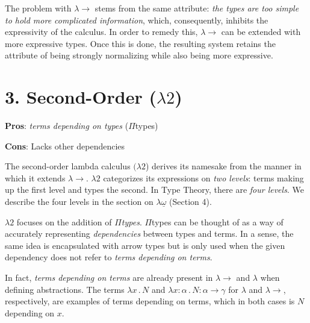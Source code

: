\documentclass[9pt,preprint,nocopyrightspace,computermodern]{sigplanconf} %
\begin{document}
The problem with \(\lambda\!\!\rightarrow\) stems from the same attribute:
\textit{the types are too simple to hold more complicated information},
which, consequently, inhibits the expressivity of the calculus. In order to
remedy this, \(\lambda\!\!\rightarrow\) can be extended with more expressive types.
Once this is done, the resulting system retains the attribute of being strongly
normalizing while also being more expressive.

\section*{3. Second-Order (\(\lambda2\))}
\begin{flushleft}
  \textbf{Pros}: \textit{terms depending on types} (\(\Pi\)types)
  \par
  \textbf{Cons}: Lacks other dependencies
\end{flushleft}
The second-order lambda calculus \((\lambda2\)) derives its namesake from the
manner in which it extends \(\lambda\!\!\rightarrow\). \(\lambda 2\) categorizes
its expressions on \textit{two levels}: terms making up the first level and types
the second. In Type Theory, there are \textit{four levels}. We describe the four
levels in the section on \(\lambda\underline\omega\) (Section 4).

\(\lambda 2\) focuses on the addition of \textit{\(\Pi\)types}. \(\Pi\)types can
be thought of as a way of accurately representing \textit{dependencies} between
types and terms. In a sense, the same idea is encapsulated with arrow types but is
only used when the given dependency does not refer to \textit{terms depending on terms}.

In fact, \textit{terms depending on terms} are already present in \(\lambda\!\!\rightarrow\)
and \(\lambda\) when defining abstractions. The terms \(\lambda x\,.\,N\) and
\(\lambda x:\alpha\,.\,N : \alpha\rightarrow\gamma\) for \(\lambda\) and
\(\lambda\!\!\rightarrow\), respectively, are examples of terms depending on terms,
which in both cases is \(N\) depending on \(x\).
\end{document}
